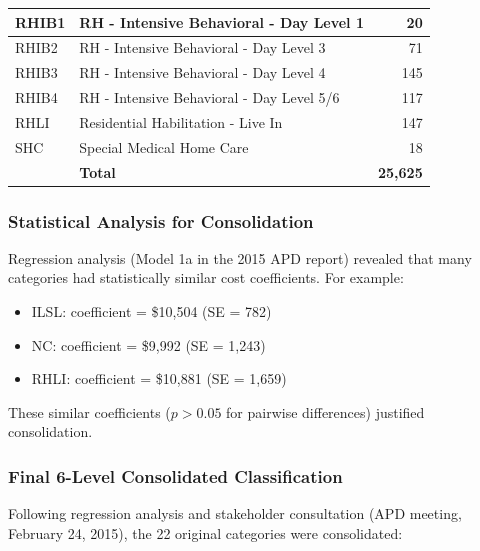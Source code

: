 \begin{table}[htbp]
\begin{tabular}{|l|p{7cm}|r|}
RHIB1 & RH - Intensive Behavioral - Day Level 1 & 20 \\
\hline
RHIB2 & RH - Intensive Behavioral - Day Level 3 & 71 \\
\hline
RHIB3 & RH - Intensive Behavioral - Day Level 4 & 145 \\
\hline
RHIB4 & RH - Intensive Behavioral - Day Level 5/6 & 117 \\
\hline
RHLI & Residential Habilitation - Live In & 147 \\
\hline
SHC & Special Medical Home Care & 18 \\
\hline
 & \textbf{Total} & \textbf{25,625} \\
\hline
\end{tabular}
\label{tab:original-living-setting}
\end{table}


\subsubsection{Statistical Analysis for Consolidation}

Regression analysis (Model 1a in the 2015 APD report) revealed that many categories had statistically similar cost coefficients. For example:
\begin{itemize}
    \item ILSL: coefficient = \$10,504 (SE = 782)
    \item NC: coefficient = \$9,992 (SE = 1,243)
    \item RHLI: coefficient = \$10,881 (SE = 1,659)
\end{itemize}

These similar coefficients ($p > 0.05$ for pairwise differences) justified consolidation.

\subsubsection{Final 6-Level Consolidated Classification}

Following regression analysis and stakeholder consultation (APD meeting, February 24, 2015), the 22 original categories were consolidated:

